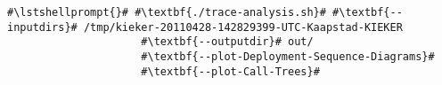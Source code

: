 \begin{lstlisting}[caption=Commands to produce the diagrams under \UnixLikeSystems,label=lst:traceAnalysis:sequenceDiagram]
#\lstshellprompt{}# #\textbf{./trace-analysis.sh}# #\textbf{--inputdirs}# /tmp/kieker-20110428-142829399-UTC-Kaapstad-KIEKER
                     #\textbf{--outputdir}# out/
                     #\textbf{--plot-Deployment-Sequence-Diagrams}#
                     #\textbf{--plot-Call-Trees}#							 
\end{lstlisting}
